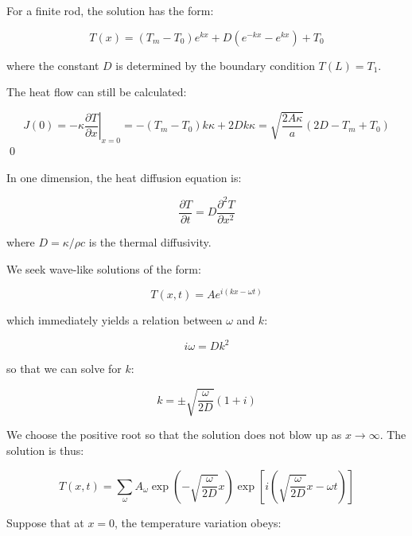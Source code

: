 \documentclass[12pt]{article}
\begin{document}
For a finite rod, the solution has the form:

\begin{equation}
    T(x) = (T_{m} - T_{0}) e^{kx} + D (e^{-kx} - e^{kx}) + T_{0}
\end{equation}

where the constant $D$ is determined by the boundary condition $T(L) = T_{1}$.

The heat flow can still be calculated:

\begin{equation}
    J(0) = -\kappa \left. \frac{\partial T}{\partial x} \right|_{x = 0} = -(T_{m} - T_{0}) k\kappa + 2Dk\kappa = \sqrt{\frac{2A\kappa}{a}} (2D - T_{m} + T_{0})
\end{equation}
\qed


In one dimension, the heat diffusion equation is:

\begin{equation}
    \frac{\partial T}{\partial t} = D \frac{\partial^{2} T}{\partial x^{2}}
\end{equation}

where $D = \kappa/\rho c$ is the thermal diffusivity.

We seek wave-like solutions of the form:

\begin{equation}
    T(x, t) = A e^{i(kx - \omega t)}
\end{equation}

which immediately yields a relation between $\omega$ and $k$:

\begin{equation}
    i\omega = D k^{2}
\end{equation}

so that we can solve for $k$:

\begin{equation}
    k = \pm \sqrt{\frac{\omega}{2D}} (1 + i)
\end{equation}

We choose the positive root so that the solution does not blow up as $x \rightarrow \infty$. The solution is thus:

\begin{equation}
    T(x, t) = \sum_{\omega} A_{\omega} \exp\left( -\sqrt{\frac{\omega}{2D}}x \right) \exp\left[ i \left( \sqrt{\frac{\omega}{2D}}x - \omega t \right) \right]
\end{equation}

Suppose that at $x = 0$, the temperature variation obeys:
\end{document}
